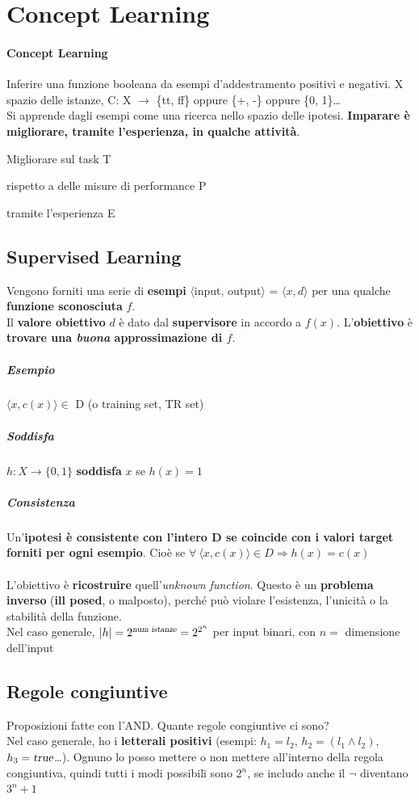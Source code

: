 \documentclass[10pt]{book}
\begin{document}
\section{Concept Learning}
\paragraph{Concept Learning} Inferire una funzione booleana da esempi d'addestramento positivi e negativi. X spazio delle istanze, C: X $\rightarrow$ \{tt, ff\} oppure \{+, -\} oppure \{0, 1\}\ldots\\
Si apprende dagli esempi come una ricerca nello spazio delle ipotesi. \textbf{Imparare è migliorare, tramite l'esperienza, in qualche attività}.
\begin{list}{}{}
	\item Migliorare sul task T
	\item rispetto a delle misure di performance P
	\item tramite l'esperienza E
\end{list}
\subsection{Supervised Learning}
Vengono forniti una serie di \textbf{esempi} $\langle$input, output$\rangle$ = $\langle x, d\rangle$ per una qualche \textbf{funzione sconosciuta} $f$.\\
Il \textbf{valore obiettivo} $d$ è dato dal \textbf{supervisore} in accordo a $f(x)$. L'\textbf{obiettivo} è \textbf{trovare una \textit{buona} approssimazione di $f$}.
\subparagraph{Esempio} $\langle x, c(x)\rangle \in$ D (o training set, TR set)
\subparagraph{Soddisfa} $h : X \rightarrow \{0, 1\}$ \textbf{soddisfa} $x$ se $h(x) = 1$
\subparagraph{Consistenza} Un'\textbf{ipotesi è consistente con l'intero D se coincide con i valori target forniti per ogni esempio}. Cioè se $\forall\:\langle x, c(x)\rangle\in D \Rightarrow h(x) = c(x)$
\paragraph{} L'obiettivo è \textbf{ricostruire} quell'\textit{unknown function}. Questo è un \textbf{problema inverso} (\textbf{ill posed}, o malposto), perché può violare l'esistenza, l'unicità o la stabilità della funzione.\\
Nel caso generale, $|h| = 2^{\textsl{num istanze}} = 2^{2^n}$ per input binari, con $n =$ dimensione dell'input
\subsection{Regole congiuntive}
Proposizioni fatte con l'AND. Quante regole congiuntive ci sono?\\
Nel caso generale, ho i \textbf{letterali positivi} (esempi: $h_1 = l_2$, $h_2 = (l_1 \wedge l_2)$, $h_3 = \textsl{true}$\ldots).
Ognuno lo posso mettere o non mettere all'interno della regola congiuntiva, quindi tutti i modi possibili sono 2$^n$, se includo anche il $\neg$ diventano $3^n + 1$
\pagebreak
\end{document}
